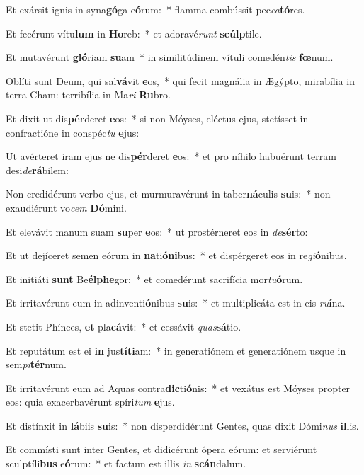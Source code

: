\item Et exársit ignis in syna\textbf{gó}ga e\textbf{ó}rum:~* flamma combússit pec\textit{ca}\textbf{tó}res.
\item Et fecérunt vítu\textbf{lum} in \textbf{Ho}reb:~* et adoravé\textit{runt} \textbf{scúlp}tile.
\item Et mutavérunt \textbf{gló}riam \textbf{su}am~* in similitúdinem vítuli comedén\textit{tis} \textbf{fœ}num.
\item Oblíti sunt Deum, qui sal\textbf{vá}vit \textbf{e}os,~* qui fecit magnália in Ægýpto, mirabília in terra Cham: terribília in Ma\textit{ri} \textbf{Ru}bro.
\item Et dixit ut dis\textbf{pér}deret \textbf{e}os:~* si non Móyses, eléctus ejus, stetísset in confractióne in conspéc\textit{tu} \textbf{e}jus:
\item Ut avérteret iram ejus ne dis\textbf{pér}deret \textbf{e}os:~* et pro níhilo habuérunt terram desi\textit{de}\textbf{rá}bilem:
\item Non credidérunt verbo ejus, et murmuravérunt in taber\textbf{ná}culis \textbf{su}is:~* non exaudiérunt vo\textit{cem} \textbf{Dó}mini.
\item Et elevávit manum suam \textbf{su}per \textbf{e}os:~* ut prostérneret eos in \textit{de}\textbf{sér}to:
\item Et ut dejíceret semen eórum in \textbf{na}ti\textbf{ó}\textbf{ni}bus:~* et dispérgeret eos in re\textit{gi}\textbf{ó}nibus.
\item Et initiáti \textbf{sunt} Be\textbf{él}\textbf{phe}gor:~* et comedérunt sacrifícia mor\textit{tu}\textbf{ó}rum.
\item Et irritavérunt eum in adinventi\textbf{ó}nibus \textbf{su}is:~* et multiplicáta est in eis \textit{ru}\textbf{í}na.
\item Et stetit Phínees, \textbf{et} pla\textbf{cá}vit:~* et cessávit \textit{quas}\textbf{sá}tio.
\item Et reputátum est ei \textbf{in} jus\textbf{tí}\textbf{ti}am:~* in generatiónem et generatiónem usque in sem\textit{pi}\textbf{tér}num.
\item Et irritavérunt eum ad Aquas contra\textbf{dic}ti\textbf{ó}nis:~* et vexátus est Móyses propter eos: quia exacerbavérunt spíri\textit{tum} \textbf{e}jus.
\item Et distínxit in \textbf{lá}biis \textbf{su}is:~* non disperdidérunt Gentes, quas dixit Dómi\textit{nus} \textbf{il}lis.
\item Et commísti sunt inter Gentes, et didicérunt ópera eórum: et serviérunt sculptíli\textbf{bus} e\textbf{ó}rum:~* et factum est illis \textit{in} \textbf{scán}dalum.
